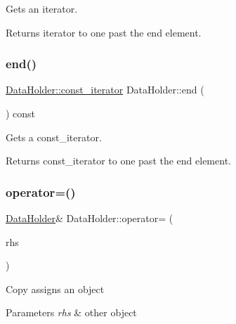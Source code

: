 Gets an iterator. \begin{DoxyReturn}{Returns}
iterator to one past the end element. 
\end{DoxyReturn}
\mbox{\label{classDataHolder_a57f9f124e39a09c87bdc789fa376cb56}} 
\subsubsection{\texorpdfstring{end()}{end()}\hspace{0.1cm}{\footnotesize\ttfamily [2/2]}}
{\footnotesize\ttfamily \hyperlink{classDataHolder_a396f5981e656ed389de16190968a2bf8}{Data\+Holder\+::const\+\_\+iterator} Data\+Holder\+::end (\begin{DoxyParamCaption}{ }\end{DoxyParamCaption}) const}

Gets a const\+\_\+iterator. \begin{DoxyReturn}{Returns}
const\+\_\+iterator to one past the end element. 
\end{DoxyReturn}
\mbox{\label{classDataHolder_a3034e2aa41d6dfefcf4e60cc76bc555b}} 
\subsubsection{\texorpdfstring{operator=()}{operator=()}\hspace{0.1cm}{\footnotesize\ttfamily [1/2]}}
{\footnotesize\ttfamily \hyperlink{classDataHolder}{Data\+Holder}\& Data\+Holder\+::operator= (\begin{DoxyParamCaption}\item[{const \hyperlink{classDataHolder}{Data\+Holder} \&}]{rhs }\end{DoxyParamCaption})\hspace{0.3cm}{\ttfamily [default]}}

Copy assigns an object 
\begin{DoxyParams}{Parameters}
{\em rhs} & other object \\
\hline
\end{DoxyParams}
\mbox{\label{classDataHolder_a16dcf3489a359c8f9c172f5178c6776f}} 

